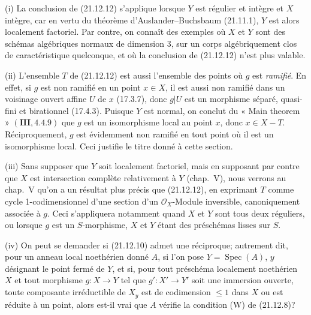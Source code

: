 \begin{remarks}[21.12.14]
\label{IV.21.12.14}
(i) La conclusion de (21.12.12) s'applique lorsque $Y$ est régulier et intègre et $X$
intègre, car en vertu du théorème d'Auslander--Buchsbaum (21.11.1), $Y$ est alors
localement factoriel. Par contre, on connaît des exemples où $X$ et $Y$ sont des schémas
algébriques normaux de dimension $3$, sur un corps algébriquement clos de
caractéristique quelconque, et où la conclusion de (21.12.12) n'est plus valable.

(ii) L'ensemble $T$ de (21.12.12) est aussi l'ensemble des points où $g$ est
\emph{ramifié}. En effet, si $g$ est non ramifié en un point $x\in X$, il est aussi non
ramifié dans un voisinage ouvert affine $U$ de $x$ (17.3.7), donc $g|U$ est un morphisme
séparé, quasi-fini et birationnel (17.4.3). Puisque $Y$ est normal, on conclut du « Main
theorem » $(\mathbf{III}, 4.4.9)$ que $g$ est un isomorphisme local au point $x$, donc
$x\in X-T$. Réciproquement, $g$ est évidemment non ramifié en tout point où il est un
isomorphisme local. Ceci justifie le titre donné à cette section.

(iii) Sans supposer que $Y$ soit localement factoriel, mais en supposant par contre que
$X$ est intersection complète relativement à $Y$ (chap.~V), nous verrons au chap.~V
qu'on a un résultat plus précis que (21.12.12), en exprimant $T$ comme cycle
1-codimensionnel d'une section d'un $\mathcal O_X$-Module inversible, canoniquement
associée à $g$. Ceci s'appliquera notamment quand $X$ et $Y$ sont tous deux réguliers,
ou lorsque $g$ est un $S$-morphisme, $X$ et $Y$ étant des préschémas lisses sur $S$.

(iv) On peut se demander si (21.12.10) admet une réciproque; autrement dit, pour un
anneau local noethérien donné $A$, si l'on pose $Y=\operatorname{Spec}(A)$, $y$
désignant le point fermé de $Y$, et si, pour tout préschéma localement noethérien $X$ et
tout morphisme $g:X\to Y$ tel que $g':X'\to Y'$ soit une immersion ouverte, toute
composante irréductible de $X_y$ est de codimension $\leq1$ dans $X$ ou est réduite à
un point, alors est-il vrai que $A$ vérifie la condition (W) de (21.12.8)?


\end{remarks}

